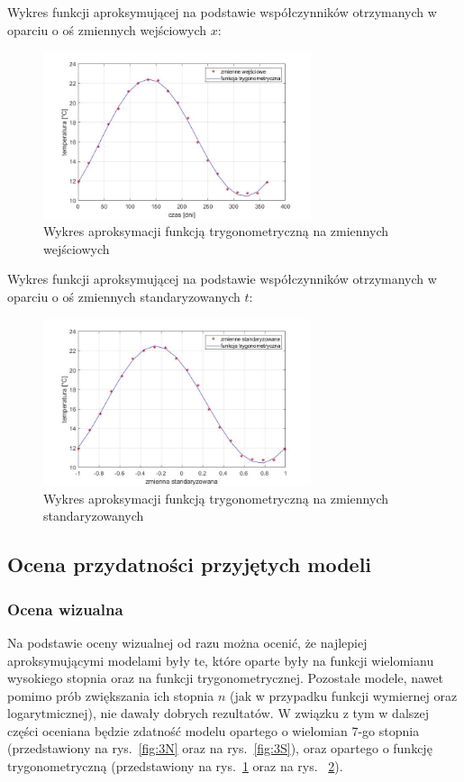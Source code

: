 \documentclass[a4paper, 12pt]{mwart}
\begin{document}
				Wykres funkcji aproksymującej na podstawie współczynników otrzymanych w oparciu
				o oś zmiennych wejściowych $x$:
				\begin{figure}[h]
					\begin{center}
						\includegraphics[width = 0.7\textwidth]{graphs/6-n.jpg}
						\caption{Wykres aproksymacji funkcją trygonometryczną na zmiennych wejściowych}
						\label{fig:6n}
					\end{center}
				\end{figure}

				Wykres funkcji aproksymującej na podstawie współczynników otrzymanych w oparciu
				o oś zmiennych standaryzowanych $t$:
				\begin{figure}[h]
					\begin{center}
						\includegraphics[width = 0.7\textwidth]{graphs/6-s.jpg}
						\caption{Wykres aproksymacji funkcją trygonometryczną na zmiennych standaryzowanych}
						\label{fig:6s}
					\end{center}
				\end{figure}

		\subsection{Ocena przydatności przyjętych modeli}
			\subsubsection{Ocena wizualna}
				Na podstawie oceny wizualnej od razu można ocenić, że najlepiej aproksymującymi modelami
				były te, które oparte były na funkcji wielomianu wysokiego stopnia oraz na funkcji
				trygonometrycznej. Pozostałe modele, nawet pomimo prób zwiększania ich stopnia $n$ (jak
				w przypadku funkcji wymiernej oraz logarytmicznej), nie
				dawały dobrych rezultatów. W związku z tym w dalszej części oceniana będzie zdatność modelu
				opartego o wielomian 7-go stopnia (przedstawiony na rys.~\ref{fig:3N} oraz na rys.~\ref{fig:3S}),
				oraz opartego o funkcję trygonometryczną (przedstawiony na rys.~\ref{fig:6n} oraz
				na rys. ~\ref{fig:6s}).
			
\end{document}

